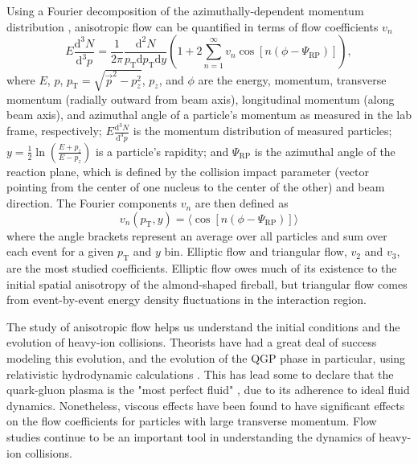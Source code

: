 Using a Fourier decomposition of the azimuthally-dependent momentum distribution \cite{Snellings:2011sz}, anisotropic flow can be quantified in terms of flow coefficients $v_n$
\begin{equation}
E \frac{\mathrm{d^3}N}{\mathrm{d^3}p} = \frac{1}{2\pi}\frac{\mathrm{d^2}N}{p_\mathrm{T}\mathrm{d}p_\mathrm{T}\mathrm{d}y}\left(1 + 2 \sum_{n=1}^{\infty} v_n \cos\left[n(\phi - \Psi_{\mathrm{RP}})\right]\right),
\end{equation}
where $E$, $p$, $p_\mathrm{T} = \sqrt{\vec{p}^2 - p_z^2}$, $p_z$, and $\phi$ are the energy, momentum, transverse momentum (radially outward from beam axis), longitudinal momentum (along beam axis), and azimuthal angle of a particle's momentum as measured in the lab frame, respectively; $E \frac{\mathrm{d^3}N}{\mathrm{d^3}p}$ is the momentum distribution of measured particles; $y = \frac{1}{2} \ln \left( \frac{E + p_z}{E - p_z} \right)$ is a particle's rapidity; and $\Psi_\mathrm{RP}$ is the azimuthal angle of the reaction plane, which is defined by the collision impact parameter (vector pointing from the center of one nucleus to the center of the other) and beam direction.
The Fourier components $v_n$ are then defined as
\begin{equation}
v_n(p_\mathrm{T},y) = \langle\cos[n(\phi - \Psi_\mathrm{RP} )]\rangle 
\end{equation}
where the angle brackets represent an average over all particles and sum over each event for a given $p_\mathrm{T}$ and $y$ bin.
Elliptic flow and triangular flow, $v_2$ and $v_3$, are the most studied coefficients.
Elliptic flow owes much of its existence to the initial spatial anisotropy of the almond-shaped fireball, but triangular flow comes from event-by-event energy density fluctuations in the interaction region.

The study of anisotropic flow helps us understand the initial conditions and the evolution of heavy-ion collisions.
Theorists have had a great deal of success modeling  this evolution, and the evolution of the QGP phase in particular, using relativistic hydrodynamic calculations \cite{Heinz:2013th}.
This has lead some to declare that the quark-gluon plasma is the "most perfect fluid" \cite{Heinz:2005zg}, due to its adherence to ideal fluid dynamics.
Nonetheless, viscous effects have been found to have significant effects on the flow coefficients for particles with large transverse momentum.
Flow studies continue to be an important tool in understanding the dynamics of heavy-ion collisions.

